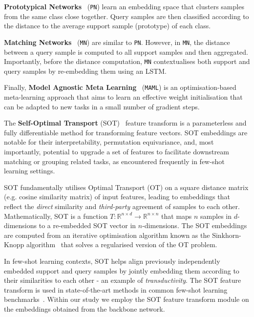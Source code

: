 \textbf{Prototypical Networks}~\cite{protonet} (\texttt{PN}) learn an embedding space that clusters samples from the same class close together. 
Query samples are then classified according to the distance to the average support sample (prototype) of each class.

\textbf{Matching Networks}~\cite{matchingnet} (\texttt{MN}) are similar to \texttt{PN}. However, in \texttt{MN}, the distance between a query sample is computed to all support samples and then aggregated. 
Importantly, before the distance computation, \texttt{MN} contextualises both support and query samples by re-embedding them using an LSTM.

Finally, \textbf{Model Agnostic Meta Learning}~\cite{maml} (\texttt{MAML}) is an optimisation-based meta-learning approach that aims to learn an effective weight initialisation that can be adapted to new tasks in a small number of gradient steps.


The \textbf{Self-Optimal Transport} (SOT)~\cite{sot} feature transform is a parameterless and fully differentiable method for transforming feature vectors. 
SOT embeddings are notable for their interpretability, permutation equivariance, and, most importantly, potential to upgrade a set of features to facilitate 
downstream matching or grouping related tasks, as encountered frequently in few-shot learning settings.

SOT fundamentally utilises Optimal Transport (OT) on a square distance matrix (e.g. cosine similarity matrix) of input features, 
leading to embeddings that reflect the \textit{direct} similarity and \textit{third-party} agreement of samples to each other. 
Mathematically, SOT is a function \(T: \mathbb{R}^{n \times d} \rightarrow \mathbb{R}^{n \times n}\) that maps \(n\) samples in \(d\)-dimensions to a 
re-embedded SOT vector in \(n\)-dimensions. The SOT embeddings are computed from an iterative optimisation algorithm known as the Sinkhorn-Knopp 
algorithm~\cite{sinkhorn-knopp} that solves a regularised version of the OT problem.

In few-shot learning contexts, SOT helps align previously independently embedded support and query samples by jointly embedding them according to their similarities to each other - an example of \textit{transductivity}. 
The SOT feature transform is used in state-of-the-art methods in common few-shot learning benchmarks~\cite{sot}. Within our study we employ the SOT feature transform module on the embeddings obtained from the backbone network.

